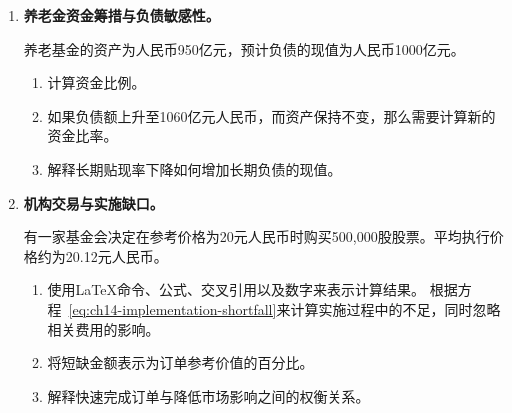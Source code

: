 \begin{enumerate}
\begin{enumerate}

\item 计算相对于净资产值的百分比溢价。

\item 描述在溢价足够覆盖交易和融资成本的情况下，潜在的创建交易的过程。

\item 解释为什么在基础证券流动性不足或市场关闭的情况下，溢价或折扣并不需要立即消失。

\end{enumerate}

\item \textbf{养老金资金筹措与负债敏感性。}

养老基金的资产为人民币950亿元，预计负债的现值为人民币1000亿元。

\begin{enumerate}

\item 计算资金比例。

\item 如果负债额上升至1060亿元人民币，而资产保持不变，那么需要计算新的资金比率。

\item 解释长期贴现率下降如何增加长期负债的现值。

\end{enumerate}

\item \textbf{机构交易与实施缺口。}

有一家基金会决定在参考价格为20元人民币时购买500,000股股票。平均执行价格约为20.12元人民币。

\begin{enumerate}

\item 使用LaTeX命令、公式、交叉引用以及数字来表示计算结果。  
根据方程~\ref{eq:ch14-implementation-shortfall}来计算实施过程中的不足，同时忽略相关费用的影响。

\item 将短缺金额表示为订单参考价值的百分比。

\item 解释快速完成订单与降低市场影响之间的权衡关系。

\end{enumerate}

\end{enumerate}



